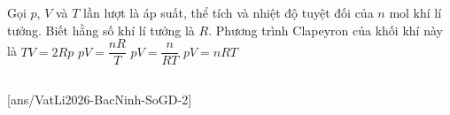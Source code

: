 	\begin{ex}%
		Gọi $p$, $V$ và $T$ lần lượt là áp suất, thể tích và nhiệt độ tuyệt đối của $n$ mol khí lí tưởng. Biết hằng số khí lí tưởng là $R$. Phương trình Clapeyron của khối khí này là
		\choice
		{$TV=2Rp$}
		{$pV=\dfrac{nR}{T}$}
		{$pV=\dfrac{n}{RT}$}
		{\True $pV=nRT$}
	\end{ex}

	\subsection*{}
	\setcounter{ex}{0}
	[ans/VatLi2026-BacNinh-SoGD-2]

